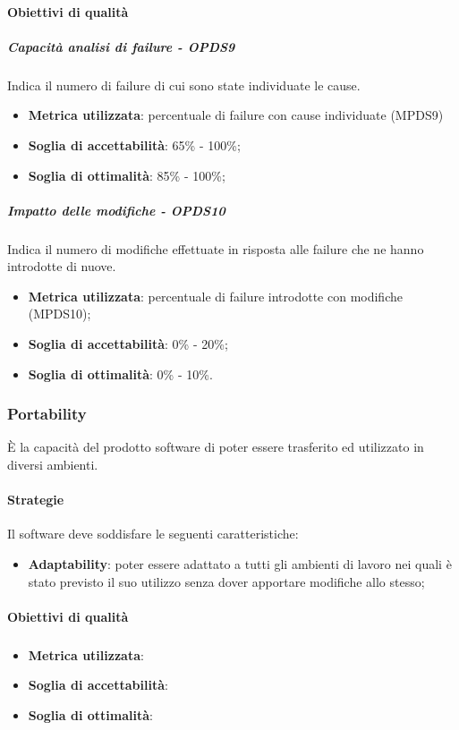 \documentclass[PianoDiQualifica.tex]{subfiles}
\begin{document}
			\paragraph{Obiettivi di qualità}
			
				\subparagraph{Capacità analisi di failure - OPDS9}
				Indica il numero di failure di cui sono state individuate le cause. 
				\begin{itemize}
					\item \textbf{Metrica utilizzata}: percentuale di failure con cause individuate (MPDS9)
					\item \textbf{Soglia di accettabilità}: 65\% - 100\%;
					\item \textbf{Soglia di ottimalità}: 85\% - 100\%;
				\end{itemize}
				
				\subparagraph{Impatto delle modifiche - OPDS10}
				Indica il numero di modifiche effettuate in risposta alle failure che ne hanno introdotte di nuove.
				\begin{itemize}
					\item \textbf{Metrica utilizzata}: percentuale di failure introdotte con modifiche (MPDS10);
					\item \textbf{Soglia di accettabilità}: 0\% - 20\%;
					\item \textbf{Soglia di ottimalità}: 0\% - 10\%.
				\end{itemize}
		
		\subsubsection{Portability}
		È la capacità del prodotto software di poter essere trasferito ed utilizzato in diversi ambienti.
	
			\paragraph{Strategie}
			Il software deve soddisfare le seguenti caratteristiche:
			\begin{itemize}
				\item \textbf{Adaptability}: poter essere adattato a tutti gli ambienti di lavoro nei quali è stato previsto il suo utilizzo senza dover apportare modifiche allo stesso;
			\end{itemize}
			
			\paragraph{Obiettivi di qualità}
			
				\subparagraph{}
				\begin{itemize}
					\item \textbf{Metrica utilizzata}:
					\item \textbf{Soglia di accettabilità}:
					\item \textbf{Soglia di ottimalità}:
				\end{itemize}
				
\end{document}
